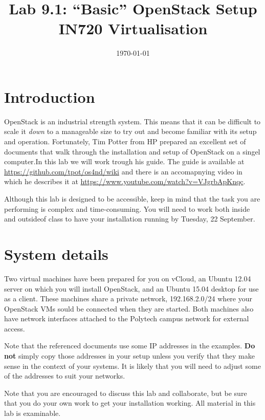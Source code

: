 \documentclass{article}
\begin{document}
\title{Lab 9.1: ``Basic'' OpenStack Setup \\ IN720 Virtualisation}
\date{\today}
\maketitle

\section*{Introduction}
OpenStack is an industrial strength system.  This means that it can be difficult to scale it \emph{down} to a manageable size to try out and become familiar with its setup and operation.   Fortunately, Tim Potter from HP prepared an excellent set of documents that walk through the installation and setup of OpenStack on a singel computer.In this lab we will work trough his guide.  The guide is available at \url{https://github.com/tpot/os4nd/wiki} and there is an accomapnying video in which he describes it at \url{https://www.youtube.com/watch?v=VJgrbApKnqc}.

Although this lab is designed to be accessible, keep in mind that the task you are performing is complex and time-consuming.  You will need to work both inside and outsideof class to have your installation running by Tuesday, 22 September.

\section{System details}
Two virtual machines have been prepared for you on vCloud, an Ubuntu 12.04 server on which you will install OpenStack, and an Ubuntu 15.04 desktop for use as a client.  These machines share a private network, 192.168.2.0/24 where your OpenStack VMs sould be connected when they are started. Both machines also have network interfaces attached to the Polytech campus network for external access.

Note that the referenced documents use some IP addresses in the examples.  \textbf{Do not} simply copy those addresses in your setup unless you verify that they make sense in the context of your systems.  It is likely that you will need to adjust some of the addresses to suit your networks.

Note that you are encouraged to discuss this lab and collaborate, but be sure that you do your own work to get your installation working.  All material in this lab is examinable. 
\end{document}
